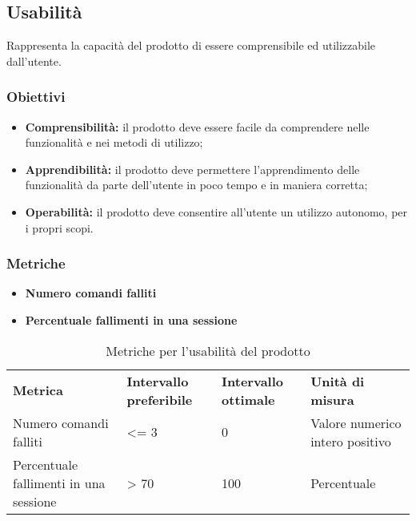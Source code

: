 %
%
%
%


\subsection{Usabilità}
Rappresenta la capacità del prodotto di essere comprensibile ed utilizzabile dall'utente.
\subsubsection{Obiettivi}
\begin{itemize}
	\item \textbf{Comprensibilità:} il prodotto deve essere facile da comprendere nelle funzionalità e nei metodi di utilizzo;
	\item \textbf{Apprendibilità:} il prodotto deve permettere l'apprendimento delle funzionalità da parte dell'utente in poco tempo e in maniera corretta;
	\item \textbf{Operabilità:} il prodotto deve consentire all'utente un utilizzo autonomo, per i propri scopi.
\end{itemize}
\subsubsection{Metriche}
\begin{itemize}
	\item \textbf{Numero comandi falliti}
	\item \textbf{Percentuale fallimenti in una sessione}
\end{itemize}

\renewcommand{\arraystretch}{2.2}
\begin{longtable}{|C{4.5cm}|C{2.25cm}|C{2.25cm}|C{3cm}|}

	\caption{Metriche per l'usabilità del prodotto}\\
	\hline

	\textbf{Metrica} & \textbf{Intervallo preferibile}  & \textbf{Intervallo ottimale} & \textbf{Unità di misura}
	\tabularnewline
	\endfirsthead

	Numero comandi falliti &  <= 3 & 0 & Valore numerico intero positivo \\
	Percentuale fallimenti in una sessione &  > 70 & 100 & Percentuale \\
\end{longtable}



